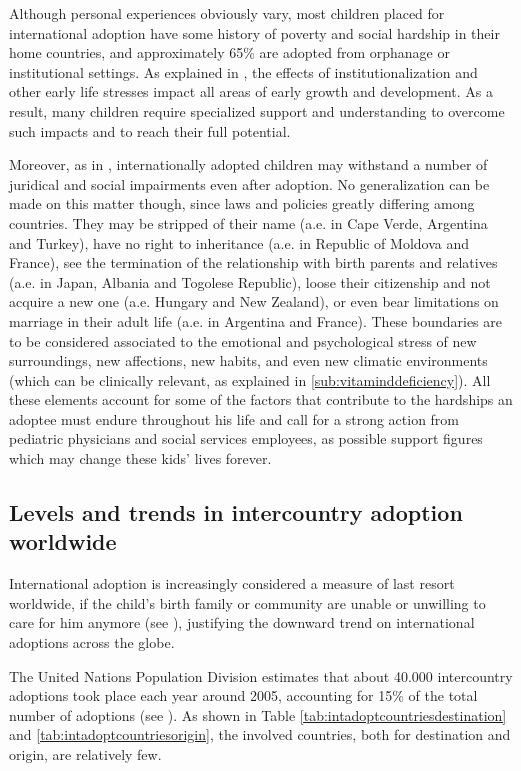 Although personal experiences obviously vary, most children placed for international adoption have some history of poverty and social hardship in their home countries, and approximately 65\% are adopted from orphanage or institutional settings. As explained in \cite{nelson}, the effects of institutionalization and other early life stresses impact all areas of early growth and development. As a result, many children require specialized support and understanding to overcome such impacts and to reach their full potential. 

Moreover, as in \cite{unreport}, internationally adopted children may withstand a number of juridical and social impairments even after adoption. No generalization can be made on this matter though, since laws and policies greatly differing among countries. They may be stripped of their name (a.e. in Cape Verde, Argentina and Turkey), have no right to inheritance (a.e. in Republic of Moldova and France), see the termination of the relationship with birth parents and relatives (a.e. in Japan, Albania and Togolese Republic), loose their citizenship and not acquire a new one (a.e. Hungary and New Zealand), or even bear limitations on marriage in their adult life (a.e. in Argentina and France). These boundaries are to be considered associated to the emotional and psychological stress of new surroundings, new affections, new habits, and even new climatic environments (which can be clinically relevant, as explained in \ref{sub:vitaminddeficiency}). \linebreak All these elements account for some of the factors that contribute to the hardships an adoptee must endure throughout his life and call for a strong action from pediatric physicians and social services employees, as possible support figures which may change these kids' lives forever.


\subsection{Levels and trends in intercountry adoption worldwide}\label{sub:levelsintercountry}
International adoption is increasingly considered a measure of last resort worldwide, if the child's birth family or community are unable or unwilling to care for him anymore (see \cite{nelson}), justifying the downward trend on international adoptions across the globe. 

The United Nations Population Division estimates that about 40.000 intercountry adoptions took place each year around 2005, accounting for 15\% of the total number of adoptions (see \cite{unreport}). As shown in Table \ref{tab:intadoptcountriesdestination} and \ref{tab:intadoptcountriesorigin}, the involved countries, both for destination and origin, are relatively few.

